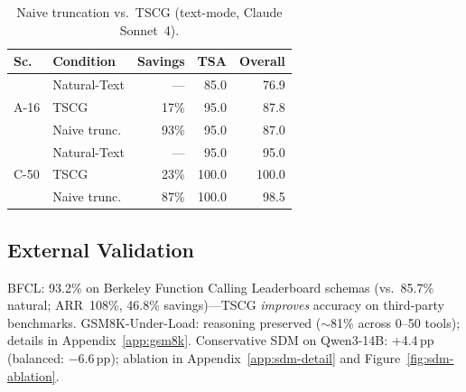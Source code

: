 \begin{table}[h]
\centering
\small
\caption{Naive truncation vs.\ TSCG (text-mode, Claude Sonnet~4).}
\label{tab:naive-truncation}
\begin{tabular}{llrrr}
\toprule
\textbf{Sc.} & \textbf{Condition} & \textbf{Savings} & \textbf{TSA} & \textbf{Overall} \\
\midrule
\multirow{3}{*}{A-16}
& Natural-Text     & ---    & 85.0 & 76.9 \\
& TSCG             & 17\% & 95.0 & 87.8 \\
& Naive trunc.     & 93\% & 95.0 & 87.0 \\
\midrule
\multirow{3}{*}{C-50}
& Natural-Text     & ---    & 95.0 & 95.0 \\
& TSCG             & 23\% & 100.0 & 100.0 \\
& Naive trunc.     & 87\% & 100.0 & 98.5 \\
\bottomrule
\end{tabular}
\end{table}

\subsection{External Validation}
\label{sec:bfcl-integration}

BFCL: 93.2\% on Berkeley Function Calling Leaderboard schemas (vs.\ 85.7\% natural; ARR~108\%, 46.8\% savings)---TSCG \emph{improves} accuracy on third-party benchmarks.
GSM8K-Under-Load: reasoning preserved (${\sim}$81\% across 0--50 tools); details in Appendix~\ref{app:gsm8k}.
Conservative SDM on Qwen3-14B: $+$4.4\,pp (balanced: $-$6.6\,pp); ablation in Appendix~\ref{app:sdm-detail} and Figure~\ref{fig:sdm-ablation}.


